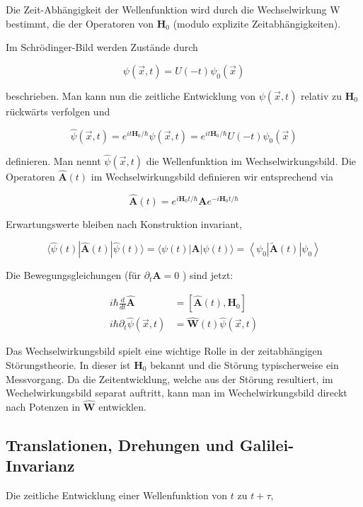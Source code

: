 \documentclass[10pt, letterpaper]{article}
\begin{document}
Die Zeit-Abhängigkeit der Wellenfunktion wird durch die Wechselwirkung W bestimmt, die der Operatoren von $\mathbf{H}_{0}$ (modulo explizite Zeitabhängigkeiten).

Im Schrödinger-Bild werden Zustände durch

$$
\psi(\vec{x}, t)=U(-t) \psi_{0}(\vec{x})
$$

beschrieben. Man kann nun die zeitliche Entwicklung von $\psi(\vec{x}, t)$ relativ zu $\mathbf{H}_{0}$ rückwärts verfolgen und

$$
\widehat{\psi}(\vec{x}, t)=e^{i t \mathbf{H}_{0} / \hbar} \psi(\vec{x}, t)=e^{i t \mathbf{H}_{0} / \hbar} U(-t) \psi_{0}(\vec{x})
$$

definieren. Man nennt $\widehat{\psi}(\vec{x}, t)$ die Wellenfunktion im Wechselwirkungsbild. Die Operatoren $\widehat{\mathbf{A}}(t)$ im Wechselwirkungsbild definieren wir entsprechend via

$$
\widehat{\mathbf{A}}(t)=e^{i \mathbf{H}_{0} t / \hbar} \mathbf{A} e^{-i \mathbf{H}_{0} t / \hbar}
$$

Erwartungswerte bleiben nach Konstruktion invariant,

$$
\langle\widehat{\psi}(t)| \widehat{\mathbf{A}}(t)|\widehat{\psi}(t)\rangle=\langle\psi(t)| \mathbf{A}|\psi(t)\rangle=\left\langle\psi_{0}\right| \tilde{\mathbf{A}}(t)\left|\psi_{0}\right\rangle
$$

Die Bewegungsgleichungen (für $\partial_{t} \mathbf{A}=0$ ) sind jetzt:

$$
\begin{aligned}
i \hbar \frac{d}{d t} \widehat{\mathbf{A}} & =\left[\widehat{\mathbf{A}}(t), \mathbf{H}_{0}\right] \\
i \hbar \partial_{t} \widehat{\psi}(\vec{x}, t) & =\widehat{\mathbf{W}}(t) \widehat{\psi}(\vec{x}, t)
\end{aligned}
$$

Das Wechselwirkungsbild spielt eine wichtige Rolle in der zeitabhängigen Störungstheorie. In dieser ist $\mathbf{H}_{0}$ bekannt und die Störung typischerweise ein Messvorgang. Da die Zeitentwicklung, welche aus der Störung resultiert, im Wechelwirkungsbild separat auftritt, kann man im Wechelwirkungsbild direckt nach Potenzen in $\widehat{\mathbf{W}}$ entwicklen.

\subsection*{Translationen, Drehungen und Galilei-Invarianz}
Die zeitliche Entwicklung einer Wellenfunktion von $t$ zu $t+\tau$,
\end{document}
